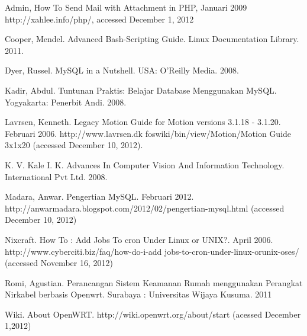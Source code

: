 \documentclass{jtetiproposalskripsi}
\begin{document}
\begin{thebibliography}{9}

Admin, How To Send Mail with Attachment in PHP, Januari 2009 http://xahlee.info/php/, accessed December 1, 2012

Cooper, Mendel. Advanced Bash-Scripting Guide. Linux Documentation Library. 2011.

Dyer, Russel. MySQL in a Nutshell. USA: O’Reilly Media. 2008.

Kadir, Abdul. Tuntunan Praktis: Belajar Database Menggunakan MySQL. Yogyakarta: Penerbit Andi. 2008.

Lavrsen, Kenneth. Legacy Motion Guide for Motion versions 3.1.18 - 3.1.20. Februari 2006. http://www.lavrsen.dk foswiki/bin/view/Motion/Motion Guide 3x1x20 (accessed December 10, 2012).

K. V. Kale I. K. Advances In Computer Vision And Information Technology. International Pvt Ltd. 2008.

Madara, Anwar. Pengertian MySQL. Februari 2012. http://anwarmadara.blogspot.com/2012/02/pengertian-mysql.html (accessed December 10, 2012)

Nixcraft. How To : Add Jobs To cron Under Linux or UNIX?. April 2006. http://www.cyberciti.biz/faq/how-do-i-add jobs-to-cron-under-linux-orunix-oses/ (accessed November 16, 2012)

Romi, Agustian. Perancangan Sistem Keamanan Rumah menggunakan Perangkat Nirkabel berbasis Openwrt. Surabaya : Universitas Wijaya Kusuma. 2011

Wiki. About OpenWRT. http://wiki.openwrt.org/about/start (acessed December 1,2012)

\end{thebibliography}
\end{document}
